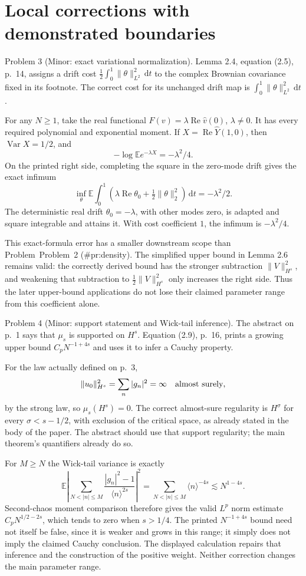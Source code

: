 \documentclass[10pt]{article}
\begin{document}
\section*{Local corrections with demonstrated boundaries}
Problem 3 (Minor: exact variational normalization).  Lemma 2.4, equation (2.5), p. 14, assigns a drift cost \(\frac12\int_0^1\|\theta\|_{L^2}^2\,\mathrm dt\) to the complex Brownian covariance fixed in its footnote. The correct cost for its unchanged drift map is \(\int_0^1\|\theta\|_{L^2}^2\,\mathrm dt\).\par
For any \(N\ge1\), take the real functional \(F(v)=\lambda\operatorname{Re}\widehat v(0)\), \(\lambda\ne0\). It has every required polynomial and exponential moment. If \(X=\operatorname{Re}\widehat Y(1,0)\), then \(\operatorname{Var}X=1/2\), and \[-\log\mathbb Ee^{-\lambda X}=-\lambda^2/4.\] On the printed right side, completing the square in the zero-mode drift gives the exact infimum \[\inf_\theta\mathbb E\int_0^1
 \left(\lambda\operatorname{Re}\theta_0+
       \tfrac12\|\theta\|_2^2\right)\,\mathrm dt
 =-\lambda^2/2.\] The deterministic real drift \(\theta_0=-\lambda\), with other modes zero, is adapted and square integrable and attains it. With cost coefficient \(1\), the infimum is \(-\lambda^2/4\).\par
This exact-formula error has a smaller downstream scope than Problem Problem 2 (\#pr:density). The simplified upper bound in Lemma 2.6 remains valid: the correctly derived bound has the stronger subtraction \(\|V\|_{H^s}^2\), and weakening that subtraction to \(\frac12\|V\|_{H^s}^2\) only increases the right side. Thus the later upper-bound applications do not lose their claimed parameter range from this coefficient alone.\par
Problem 4 (Minor: support statement and Wick-tail inference).  The abstract on p. 1 says that \(\mu_s\) is supported on \(H^s\). Equation (2.9), p. 16, prints a growing upper bound \(C_pN^{-1+4s}\) and uses it to infer a Cauchy property.\par
For the law actually defined on p. 3, \[\|u_0\|_{H^s}^2=\sum_n|g_n|^2=\infty
 \quad\hbox{almost surely},\] by the strong law, so \(\mu_s(H^s)=0\). The correct almost-sure regularity is \(H^\sigma\) for every \(\sigma<s-1/2\), with exclusion of the critical space, as already stated in the body of the paper. The abstract should use that support regularity; the main theorem’s quantifiers already do so.\par
For \(M\ge N\) the Wick-tail variance is exactly \[\mathbb E\left|\sum_{N<|n|\le M}
          \frac{|g_n|^2-1}{\langle n\rangle^{2s}}\right|^2
 =\sum_{N<|n|\le M}\langle n\rangle^{-4s}
 \lesssim N^{1-4s}.\] Second-chaos moment comparison therefore gives the valid \(L^p\) norm estimate \(C_pN^{1/2-2s}\), which tends to zero when \(s>1/4\). The printed \(N^{-1+4s}\) bound need not itself be false, since it is weaker and grows in this range; it simply does not imply the claimed Cauchy conclusion. The displayed calculation repairs that inference and the construction of the positive weight. Neither correction changes the main parameter range.\par
\end{document}
